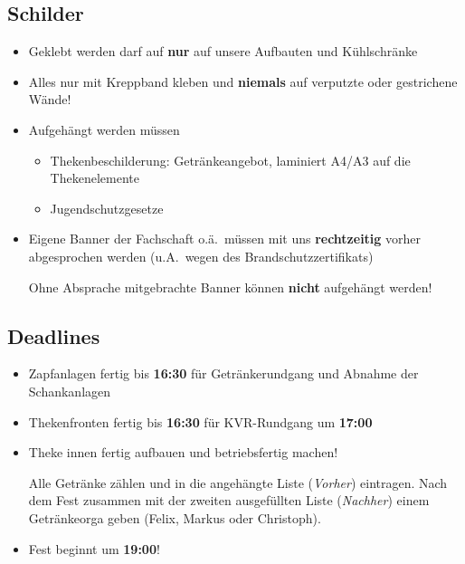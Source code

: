 \subsection{Schilder}
\begin{itemize}
  \item Geklebt werden darf auf \textbf{nur} auf unsere Aufbauten und Kühlschränke
  \item Alles nur mit Kreppband kleben und \textbf{niemals} auf verputzte oder gestrichene Wände!
  \item Aufgehängt werden müssen
    \begin{itemize}
      \item Thekenbeschilderung: Getränkeangebot, laminiert A4/A3 auf die Thekenelemente
      \item Jugendschutzgesetze
    \end{itemize}
  \item Eigene Banner der Fachschaft o.ä.\ müssen mit uns \textbf{rechtzeitig} vorher abgesprochen werden (u.A.\ wegen des Brandschutzzertifikats)

    Ohne Absprache mitgebrachte Banner können \textbf{nicht} aufgehängt werden!
\end{itemize}
\subsection{Deadlines}
\begin{itemize}
  \item Zapfanlagen fertig bis \textbf{16:30} für Getränkerundgang und Abnahme der Schankanlagen
  \item Thekenfronten fertig bis \textbf{16:30} für KVR-Rundgang um \textbf{17:00}
  \item Theke innen fertig aufbauen und betriebsfertig machen!

    Alle Getränke zählen und in die angehängte Liste (\emph{Vorher}) eintragen. Nach dem Fest zusammen mit der zweiten ausgefüllten Liste (\emph{Nachher}) einem Getränkeorga geben (Felix, Markus oder Christoph).
  \item \large{Fest beginnt um \textbf{19:00}!}
\end{itemize}
